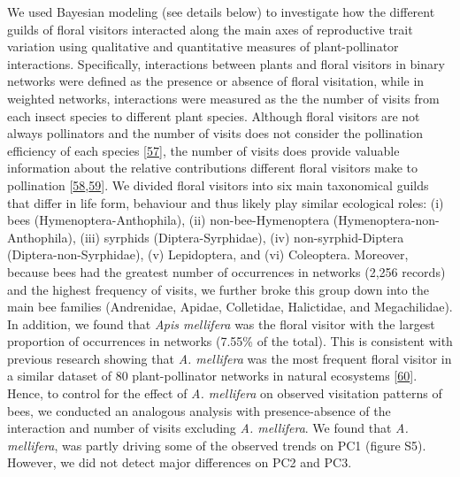 \documentclass[
  12pt,
  a4paper,
]{article}
\begin{document}
We used Bayesian modeling (see details below) to investigate how the different guilds of floral visitors interacted along the main axes of reproductive trait variation using qualitative and quantitative measures of plant-pollinator interactions. Specifically, interactions between plants and floral visitors in binary networks were defined as the presence or absence of floral visitation, while in weighted networks, interactions were measured as the the number of visits from each insect species to different plant species. Although floral visitors are not always pollinators and the number of visits does not consider the pollination efficiency of each species {[}\protect\hyperlink{ref-ballantyne2015}{57}{]}, the number of visits does provide valuable information about the relative contributions different floral visitors make to pollination {[}\protect\hyperlink{ref-vazquez2005}{58},\protect\hyperlink{ref-vazquez2012}{59}{]}. We divided floral visitors into six main taxonomical guilds that differ in life form, behaviour and thus likely play similar ecological roles: (i) bees (Hymenoptera-Anthophila), (ii) non-bee-Hymenoptera (Hymenoptera-non-Anthophila), (iii) syrphids (Diptera-Syrphidae), (iv) non-syrphid-Diptera (Diptera-non-Syrphidae), (v) Lepidoptera, and (vi) Coleoptera. Moreover, because bees had the greatest number of occurrences in networks (2,256 records) and the highest frequency of visits, we further broke this group down into the main bee families (Andrenidae, Apidae, Colletidae, Halictidae, and Megachilidae). In addition, we found that \emph{Apis mellifera} was the floral visitor with the largest proportion of occurrences in networks (7.55\% of the total). This is consistent with previous research showing that \emph{A. mellifera} was the most frequent floral visitor in a similar dataset of 80 plant-pollinator networks in natural ecosystems {[}\protect\hyperlink{ref-hung2018}{60}{]}. Hence, to control for the effect of \emph{A. mellifera} on observed visitation patterns of bees, we conducted an analogous analysis with presence-absence of the interaction and number of visits excluding \emph{A. mellifera}. We found that \emph{A. mellifera}, was partly driving some of the observed trends on PC1 (figure S5). However, we did not detect major differences on PC2 and PC3.
\end{document}
